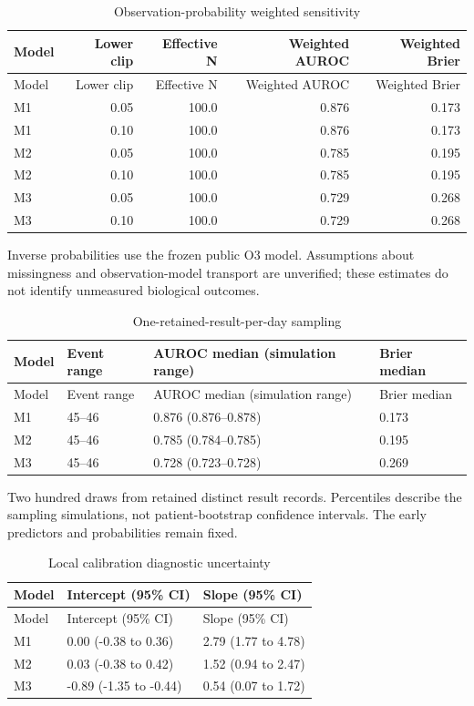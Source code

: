 \documentclass[pdflatex,sn-vancouver-num]{sn-jnl}
\begin{document}
\begin{longtable}{lrrrr}
\caption{Observation-probability weighted sensitivity}\label{tab:s11}\\
\toprule
Model & Lower clip & Effective N & Weighted AUROC & Weighted Brier\\\midrule
\endfirsthead
\toprule
Model & Lower clip & Effective N & Weighted AUROC & Weighted Brier\\\midrule
\endhead
\endfoot
\bottomrule\endlastfoot
M1 & 0.05 & 100.0 & 0.876 & 0.173\\
M1 & 0.10 & 100.0 & 0.876 & 0.173\\
M2 & 0.05 & 100.0 & 0.785 & 0.195\\
M2 & 0.10 & 100.0 & 0.785 & 0.195\\
M3 & 0.05 & 100.0 & 0.729 & 0.268\\
M3 & 0.10 & 100.0 & 0.729 & 0.268\\
\end{longtable}
\noindent Inverse probabilities use the frozen public O3 model. Assumptions about missingness and observation-model transport are unverified; these estimates do not identify unmeasured biological outcomes.\par\endgroup
\begingroup\scriptsize\setlength{\tabcolsep}{2pt}
\begin{longtable}{llll}
\caption{One-retained-result-per-day sampling}\label{tab:s12}\\
\toprule
Model & Event range & AUROC median (simulation range) & Brier median\\\midrule
\endfirsthead
\toprule
Model & Event range & AUROC median (simulation range) & Brier median\\\midrule
\endhead
\endfoot
\bottomrule\endlastfoot
M1 & 45--46 & 0.876 (0.876--0.878) & 0.173\\
M2 & 45--46 & 0.785 (0.784--0.785) & 0.195\\
M3 & 45--46 & 0.728 (0.723--0.728) & 0.269\\
\end{longtable}
\noindent Two hundred draws from retained distinct result records. Percentiles describe the sampling simulations, not patient-bootstrap confidence intervals. The early predictors and probabilities remain fixed.\par\endgroup
\begingroup\scriptsize\setlength{\tabcolsep}{2pt}
\begin{longtable}{lll}
\caption{Local calibration diagnostic uncertainty}\label{tab:s13}\\
\toprule
Model & Intercept (95\% CI) & Slope (95\% CI)\\\midrule
\endfirsthead
\toprule
Model & Intercept (95\% CI) & Slope (95\% CI)\\\midrule
\endhead
\endfoot
\bottomrule\endlastfoot
M1 & 0.00 (-0.38 to 0.36) & 2.79 (1.77 to 4.78)\\
M2 & 0.03 (-0.38 to 0.42) & 1.52 (0.94 to 2.47)\\
M3 & -0.89 (-1.35 to -0.44) & 0.54 (0.07 to 1.72)\\
\end{longtable}
\end{document}

